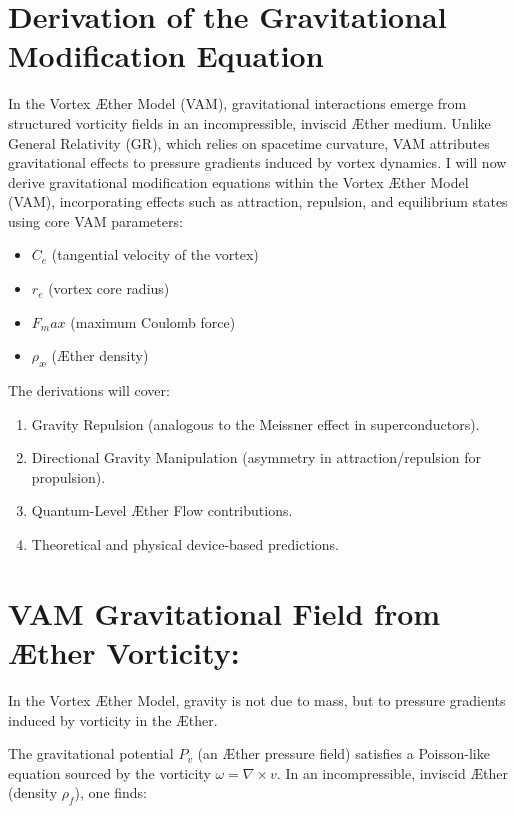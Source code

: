 \section{Derivation of the Gravitational Modification Equation}


In the Vortex Æther Model (VAM), gravitational interactions emerge from structured vorticity fields in an incompressible, inviscid Æther medium. Unlike General Relativity (GR), which relies on spacetime curvature, VAM attributes gravitational effects to pressure gradients induced by vortex dynamics. I will now derive gravitational modification equations within the Vortex Æther Model (VAM), incorporating effects such as attraction, repulsion, and equilibrium states using core VAM parameters:

\begin{itemize}
    \item $C_e$ (tangential velocity of the vortex)
    \item $r_e$ (vortex core radius)
    \item $F_max$ (maximum Coulomb force)
    \item $\rho_\text{\ae}$ (Æther density)
\end{itemize}

The derivations will cover:

\begin{enumerate}
    \item Gravity Repulsion (analogous to the Meissner effect in superconductors).
    \item Directional Gravity Manipulation (asymmetry in attraction/repulsion for propulsion).
    \item Quantum-Level Æther Flow contributions.
    \item Theoretical and physical device-based predictions.
\end{enumerate}


\section*{VAM Gravitational Field from Æther Vorticity:}
In the Vortex Æther Model, gravity is not due to mass, but to pressure gradients induced by vorticity in the Æther.

The gravitational potential $P_v$ (an Æther pressure field) satisfies a Poisson-like equation sourced by the vorticity $\omega=\nabla\times v$. In an incompressible, inviscid Æther (density $\rho_{\scriptscriptstyle\boldsymbol\!f}$), one finds:

